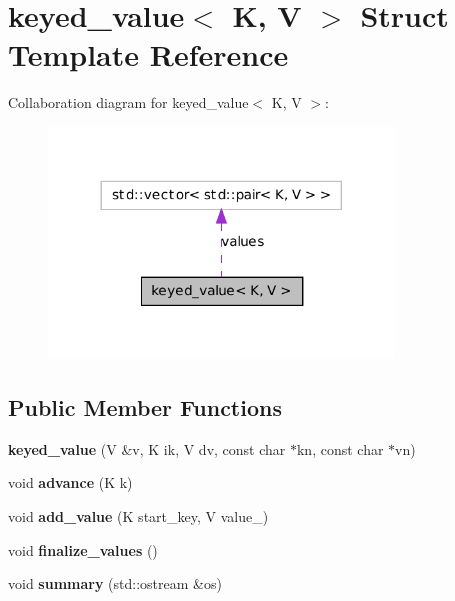 \hypertarget{structkeyed__value}{
\section{keyed\_\-value$<$ K, V $>$ Struct Template Reference}
\label{structkeyed__value}
}


Collaboration diagram for keyed\_\-value$<$ K, V $>$:
\nopagebreak
\begin{figure}[H]
\begin{center}
\leavevmode
\includegraphics[width=260pt]{structkeyed__value__coll__graph}
\end{center}
\end{figure}
\subsection*{Public Member Functions}
\begin{DoxyCompactItemize}
\item 
\hypertarget{structkeyed__value_a070ede3e70ac1ab0555bf9d71d5f8c12}{
{\bfseries keyed\_\-value} (V \&v, K ik, V dv, const char $\ast$kn, const char $\ast$vn)}
\label{structkeyed__value_a070ede3e70ac1ab0555bf9d71d5f8c12}

\item 
\hypertarget{structkeyed__value_ad5f3fc8cbbc36fc6952c5bed15a22080}{
void {\bfseries advance} (K k)}
\label{structkeyed__value_ad5f3fc8cbbc36fc6952c5bed15a22080}

\item 
\hypertarget{structkeyed__value_adec20e3cf21ac1b2ad02deb5c9ede33c}{
void {\bfseries add\_\-value} (K start\_\-key, V value\_\-)}
\label{structkeyed__value_adec20e3cf21ac1b2ad02deb5c9ede33c}

\item 
\hypertarget{structkeyed__value_a7b68e8c5bb040a053c38f8a865e96daa}{
void {\bfseries finalize\_\-values} ()}
\label{structkeyed__value_a7b68e8c5bb040a053c38f8a865e96daa}

\item 
\hypertarget{structkeyed__value_a033b9d4b1f8f9b9d98ce3611a7046dc0}{
void {\bfseries summary} (std::ostream \&os)}
\label{structkeyed__value_a033b9d4b1f8f9b9d98ce3611a7046dc0}

\end{DoxyCompactItemize}
